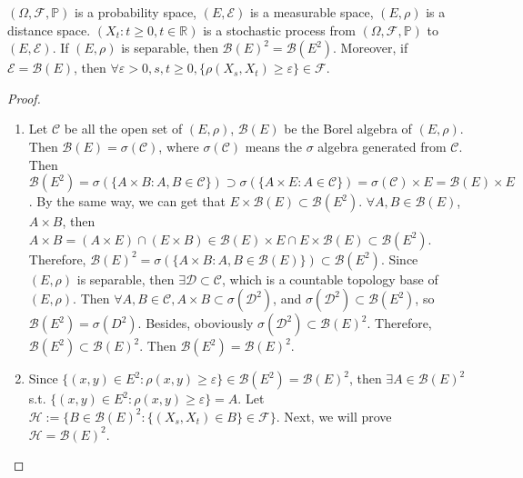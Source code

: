 \documentclass{ctexart}
\begin{document}
\begin{lemma}\label{lem:2.2}
	\((\Omega,\mathscr{F},\mathbb{P})\) is a probability space, \((E,\mathscr{E})\) is a
	measurable space, \((E,\rho)\) is a distance space.
	\((X_t:t \geq 0, t \in \mathbb{R})\) is a stochastic process from
	\((\Omega,\mathscr{F},\mathbb{P})\) to \((E,\mathscr{E})\).
	If \((E, \rho)\) is separable, then \(\mathscr{B}(E)^2= \mathscr{B}(E^2)\).
	Moreover, if \(\mathscr{E} = \mathscr{B}(E)\), then \(\forall \varepsilon>0, s,t \geq 0, \{\rho(X_s,X_t) \geq \varepsilon\} \in \mathscr{F}\).

\end{lemma}
\begin{proof}
	\begin{enumerate}
		\item Let \(\mathscr{C}\) be all the open set of \((E,\rho)\), \(\mathscr{B}(E)\) be the Borel algebra
			of \((E,\rho)\). Then \(\mathscr{B}(E) = \sigma(\mathscr{C})\), where \(\sigma(\mathscr{C})\)
			means the \(\sigma\) algebra generated from \(\mathscr{C}\).
			Then \(\mathscr{B}(E^2)= \sigma(\{A \times B: A, B \in \mathscr{C}\}) \supset \sigma(\{A \times E :A \in \mathscr{C}\}) = \sigma(\mathscr{C})\times E=\mathscr{B}(E) \times E\).
			By the same way, we can get that \(E \times \mathscr{B}(E) \subset \mathscr{B}(E^2)\).
			\(\forall A,B \in \mathscr{B}(E)\), \(A \times B\), then \( A \times B= (A \times E) \cap (E \times B) \in \mathscr{B}(E) \times E \cap E \times \mathscr{B}(E) \subset \mathscr{B}(E^2)\).
			Therefore, \(\mathscr{B}(E)^2 = \sigma(\{A \times B: A, B \in \mathscr{B}(E)\}) \subset \mathscr{B}(E^2)\).
			Since \((E,\rho)\) is separable, then \(\exists \mathscr{D} \subset \mathscr{C}\), which
			is a countable topology base of \((E,\rho)\).
			Then \(\forall A,B \in \mathscr{C}, A \times B \subset \sigma(\mathscr{D}^2)\),
			and \(\sigma(\mathscr{D}^2) \subset \mathscr{B}(E^2)\),
			so \(\mathscr{B}(E^2)= \sigma(D^2)\).
			Besides, oboviously \(\sigma(\mathscr{D}^2) \subset \mathscr{B}(E)^2\).
			Therefore, \(\mathscr{B}(E^2) \subset \mathscr{B}(E)^2\).
			Then \(\mathscr{B}(E^2) = \mathscr{B}(E)^2\).
		\item Since \(\{(x,y) \in E^2: \rho(x,y) \geq \varepsilon\} \in \mathscr{B}(E^2) = \mathscr{B}(E)^2\),
			then \(\exists A \in \mathscr{B}(E)^2\) s.t.
			\(\{(x,y) \in E^2: \rho(x,y) \geq \varepsilon\} = A\).
			Let \(\mathscr{H}:= \{B \in \mathscr{B}(E)^2: \{(X_s,X_t) \in B\} \in \mathscr{F}\}\).
			Next, we will prove \(\mathscr{H} = \mathscr{B}(E)^2\).
			\begin{enumerate}

\end{enumerate}
\end{enumerate}
\end{proof}
\end{document}
